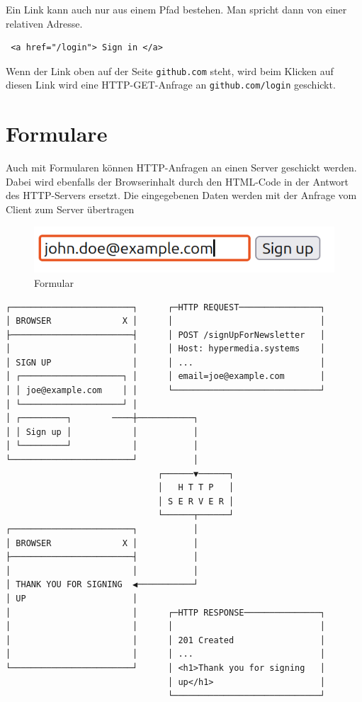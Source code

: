 \documentclass[a4paper]{scrartcl}
\begin{document}
Ein Link kann auch nur aus einem Pfad bestehen.
Man spricht dann von einer relativen Adresse.

\begin{verbatim}
 <a href="/login"> Sign in </a> 
\end{verbatim}

Wenn der Link oben auf der Seite \texttt{github.com} steht, wird beim Klicken auf diesen Link wird eine HTTP-GET-Anfrage an \texttt{github.com/login} geschickt.

\section{Formulare}

Auch mit Formularen können HTTP-Anfragen an einen Server geschickt werden.
Dabei wird ebenfalls der Browserinhalt durch den HTML-Code in der Antwort des HTTP-Servers ersetzt.
Die eingegebenen Daten werden mit der Anfrage vom Client zum Server übertragen

\begin{figure}[H]
\centering
\includegraphics[width=0.5\linewidth]{formular}
\caption{Formular}
\label{fig:formular}
\end{figure}
\scriptsize
\begin{Verbatim}
┌────────────────────────┐      ┌─HTTP REQUEST────────────────┐
│ BROWSER              X │      │                             │
├────────────────────────┤      │ POST /signUpForNewsletter   │
│                        │      │ Host: hypermedia.systems    │
│ SIGN UP                │      │ ...                         │
│ ┌────────────────────┐ │      │ email=joe@example.com       │
│ │ joe@example.com    │ │      └─────────────────────────────┘
│ └────────────────────┘ │
│ ┌─────────┐        ────┼───────────┐
│ │ Sign up │            │           │
│ └─────────┘            │           │
└────────────────────────┘           │
                              ┌──────▼──────┐
                              │   H T T P   │
                              │ S E R V E R │
                              └──────┬──────┘
┌────────────────────────┐           │
│ BROWSER              X │           │
├────────────────────────┤           │
│                        │           │
│ THANK YOU FOR SIGNING  ◀───────────┘
│ UP                     │
│                        │      ┌─HTTP RESPONSE───────────────┐
│                        │      │                             │
│                        │      │ 201 Created                 │
│                        │      │ ...                         │
└────────────────────────┘      │ <h1>Thank you for signing   │
                                │ up</h1>                     │
                                └─────────────────────────────┘
\end{Verbatim}
\normalsize
\end{document}
